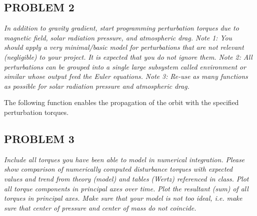 \subsection{PROBLEM 2}
\textit{In addition to gravity gradient, start programming perturbation torques due to magnetic field, solar radiation pressure, and atmospheric drag. Note 1: You should apply a very minimal/basic model for perturbations that are not relevant (negligible) to your project. It is expected that you do not ignore them. Note 2: All perturbations can be grouped into a single large subsystem called environment or similar whose output feed
the Euler equations. Note 3: Re-use as many functions as possible for solar radiation pressure and atmospheric drag.}

The following function enables the propagation of the orbit with the specified perturbation torques.



\subsection{PROBLEM 3}
\textit{Include all torques you have been able to model in numerical integration. Please show comparison of numerically computed disturbance torques with expected values and trend from theory (model) and tables (Wertz) referenced in class. Plot all torque components in principal axes over time. Plot the resultant (sum) of all torques in principal axes. Make sure that your model is not too ideal, i.e. make sure that center of pressure and center of mass do not coincide.}

